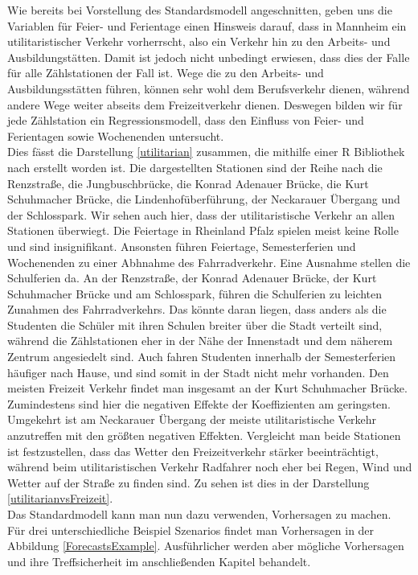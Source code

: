 \documentclass[a4paper,12pt]{thesis}
\begin{document}
Wie bereits bei Vorstellung des Standardsmodell angeschnitten, geben uns die Variablen für Feier- und Ferientage einen Hinsweis darauf, dass in Mannheim ein utilitaristischer Verkehr vorherrscht, also ein Verkehr hin zu den Arbeits- und Ausbildungstätten. Damit ist jedoch nicht unbedingt erwiesen, dass dies der Falle für alle Zählstationen der Fall ist. Wege die zu den Arbeits- und Ausbildungsstätten führen, können sehr wohl dem Berufsverkehr dienen, während andere Wege weiter abseits dem Freizeitverkehr dienen. Deswegen bilden wir für jede Zählstation ein Regressionsmodell, dass den Einfluss von Feier- und Ferientagen sowie Wochenenden untersucht.\\ 
Dies fässt die Darstellung \ref{utilitarian} zusammen, die mithilfe einer R Bibliothek nach \cite{Hlavac2022} erstellt worden ist. Die dargestellten Stationen sind der Reihe nach die Renzstraße, die Jungbuschbrücke, die Konrad Adenauer Brücke, die Kurt Schuhmacher Brücke, die Lindenhofüberführung, der Neckarauer Übergang und der Schlosspark. Wir sehen auch hier, dass der utilitaristische Verkehr an allen Stationen überwiegt. Die Feiertage in Rheinland Pfalz spielen meist keine Rolle und sind insignifikant. Ansonsten führen Feiertage, Semesterferien und Wochenenden zu einer Abhnahme des Fahrradverkehr. Eine Ausnahme stellen die Schulferien da. An der Renzstraße, der Konrad Adenauer Brücke, der Kurt Schuhmacher Brücke und am Schlosspark, führen die Schulferien zu leichten Zunahmen des Fahrradverkehrs. Das könnte daran liegen, dass anders als die Studenten die Schüler mit ihren Schulen breiter über die Stadt verteilt sind, während die Zählstationen eher in der Nähe der Innenstadt und dem näherem Zentrum angesiedelt sind. Auch fahren Studenten innerhalb der Semesterferien häufiger nach Hause, und sind somit in der Stadt nicht mehr vorhanden. Den meisten Freizeit Verkehr findet man insgesamt an der Kurt Schuhmacher Brücke. Zumindestens sind hier die negativen Effekte der Koeffizienten am geringsten. Umgekehrt ist am Neckarauer Übergang der meiste utilitaristische Verkehr anzutreffen mit den größten negativen Effekten. Vergleicht man beide Stationen ist festzustellen, dass das Wetter den Freizeitverkehr stärker beeinträchtigt, während beim utilitaristischen Verkehr Radfahrer noch eher bei Regen, Wind und Wetter auf der Straße zu finden sind. Zu sehen ist dies in der Darstellung \ref{utilitarianvsFreizeit}.\\
Das Standardmodell kann man nun dazu verwenden, Vorhersagen zu machen. Für drei unterschiedliche Beispiel Szenarios findet man Vorhersagen in der Abbildung \ref{ForecastsExample}. Ausführlicher werden aber mögliche Vorhersagen und ihre Treffsicherheit im anschließenden Kapitel behandelt.
\end{document}
